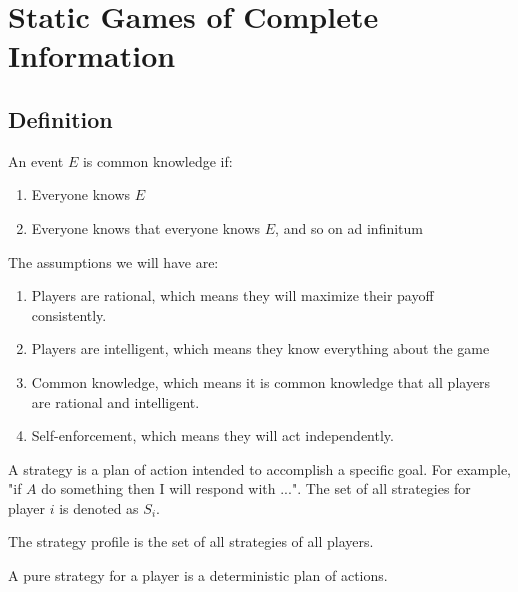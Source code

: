 \section{Static Games of Complete Information}

\subsection{Definition}

\begin{definition}
    An event $E$ is common knowledge if:
    \begin{enumerate}
        \item Everyone knows $E$
        \item Everyone knows that everyone knows $E$, and so on ad infinitum
    \end{enumerate}
\end{definition}

The assumptions we will have are:
\begin{enumerate}
    \item Players are rational, which means they will maximize their payoff consistently.
    \item Players are intelligent, which means they know everything about the game
    \item Common knowledge, which means it is common knowledge that all players are rational and intelligent.
    \item Self-enforcement, which means they will act independently.
\end{enumerate}

\begin{definition}
    A strategy is a plan of action intended to accomplish a specific goal. For example, "if $A$ do something then I will respond with ...". The set of all strategies for player $i$ is denoted as $S_i$.
\end{definition}

\begin{definition}
    The strategy profile is the set of all strategies of all players.
\end{definition}

\begin{definition}
    A pure strategy for a player is a deterministic plan of actions.
\end{definition}

